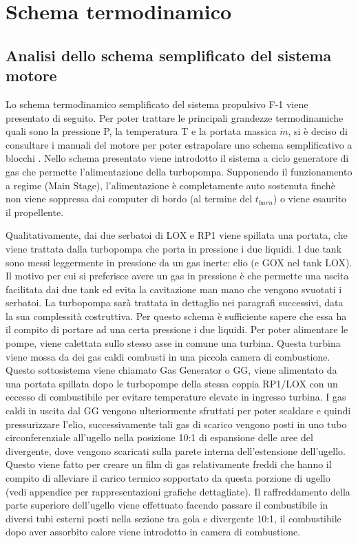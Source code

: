 \section{Schema termodinamico}
\label{sec:schema termodinamico}

\subsection{Analisi dello schema semplificato del sistema motore}
Lo schema termodinamico semplificato del sistema propulsivo F-1 viene presentato di seguito. Per poter trattare le principali grandezze termodinamiche quali sono la pressione P, la temperatura T e la portata massica $ \dot{m} $, si è deciso di consultare i manuali del motore per poter estrapolare uno schema semplificativo a blocchi \cite{engine_manual}. Nello schema presentato viene introdotto il sistema a ciclo generatore di gas che permette l’alimentazione della turbopompa. Supponendo il funzionamento a regime (Main Stage), l’alimentazione è completamente auto sostenuta finchè non viene soppressa dai computer di bordo (al termine del $ t_{burn} $) o viene esaurito il propellente.

Qualitativamente, dai due serbatoi di LOX e RP1 viene spillata una portata, che viene trattata dalla turbopompa che porta in pressione i due liquidi. I due tank sono messi leggermente in pressione da un gas inerte: elio (e GOX nel tank LOX). Il motivo per cui si preferisce avere un gas in pressione è che permette una uscita facilitata dai due tank ed evita la cavitazione man mano che vengono svuotati i serbatoi. La turbopompa sarà trattata in dettaglio nei paragrafi successivi, data la sua complessità costruttiva. Per questo schema è sufficiente sapere che essa ha il compito di portare ad una certa pressione i due liquidi. Per poter alimentare le pompe, viene calettata sullo stesso asse in comune una turbina. Questa turbina viene mossa da dei gas caldi combusti in una piccola camera di combustione. Questo sottosistema viene chiamato Gas Generator o GG, viene alimentato da una portata spillata dopo le turbopompe della stessa coppia RP1/LOX con un eccesso di combustibile per evitare temperature elevate in ingresso turbina. I gas caldi in uscita dal GG vengono ulteriormente sfruttati per poter scaldare e quindi pressurizzare l’elio, successivamente tali gas di scarico vengono posti in uno tubo circonferenziale all’ugello nella posizione 10:1 di espansione delle aree del divergente, dove vengono scaricati sulla parete interna dell’estensione dell’ugello. Questo viene fatto per creare un film di gas relativamente freddi che hanno il compito di alleviare il carico termico sopportato da questa porzione di ugello (vedi appendice per rappresentazioni grafiche dettagliate). Il raffreddamento della parte superiore dell’ugello viene effettuato facendo passare il combustibile in diversi tubi esterni posti nella sezione tra gola e divergente 10:1, il combustibile dopo aver assorbito calore viene introdotto in camera di combustione.

